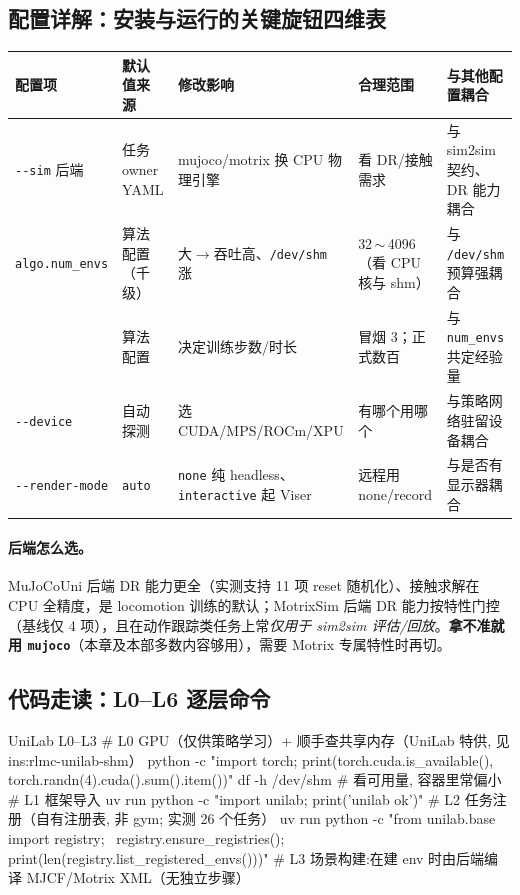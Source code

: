 \subsection{配置详解：安装与运行的关键旋钮四维表}

\begin{center}
\small
\begin{tabular}{@{}p{2.4cm}p{2.4cm}p{3.0cm}p{2.6cm}p{2.6cm}@{}}
\toprule
配置项 & 默认值来源 & 修改影响 & 合理范围 & 与其他配置耦合 \\
\midrule
\verb|--sim| 后端 & 任务 owner YAML & mujoco/motrix 换 CPU 物理引擎 & 看 DR/接触需求 & 与 sim2sim 契约、DR 能力耦合 \\
\verb|algo.num_envs| & 算法配置（千级） & 大$\to$吞吐高、\verb|/dev/shm| 涨 & 32\,$\sim$\,4096（看 CPU 核与 shm） & 与 \verb|/dev/shm| 预算强耦合 \\
\Verb[breaklines]|algo.max_iterations| & 算法配置 & 决定训练步数/时长 & 冒烟 3；正式数百 & 与 \verb|num_envs| 共定经验量 \\
\verb|--device| & 自动探测 & 选 CUDA/MPS/ROCm/XPU & 有哪个用哪个 & 与策略网络驻留设备耦合 \\
\verb|--render-mode| & \verb|auto| & \verb|none| 纯 headless、\verb|interactive| 起 Viser & 远程用 none/record & 与是否有显示器耦合 \\
\bottomrule
\end{tabular}
\end{center}

\paragraph{后端怎么选。}MuJoCoUni 后端 DR 能力更全（实测支持 11 项 reset 随机化）、接触求解在 CPU 全精度，是 locomotion 训练的默认；MotrixSim 后端 DR 能力按特性门控（基线仅 4 项），且在动作跟踪类任务上常\emph{仅用于 sim2sim 评估/回放}。\textbf{拿不准就用 \texttt{mujoco}}（本章及本部多数内容够用），需要 Motrix 专属特性时再切。

\subsection{代码走读：L0--L6 逐层命令}

\begin{codebox}[bash]{UniLab L0--L3}
# L0 GPU（仅供策略学习）+ 顺手查共享内存（UniLab 特供, 见 ins:rlmc-unilab-shm）
python -c "import torch; print(torch.cuda.is_available(), torch.randn(4).cuda().sum().item())"
df -h /dev/shm                                  # 看可用量, 容器里常偏小
# L1 框架导入
uv run python -c "import unilab; print('unilab ok')"
# L2 任务注册（自有注册表, 非 gym; 实测 26 个任务）
uv run python -c "from unilab.base import registry; \
    registry.ensure_registries(); print(len(registry.list_registered_envs()))"
# L3 场景构建:在建 env 时由后端编译 MJCF/Motrix XML（无独立步骤）
\end{codebox}

